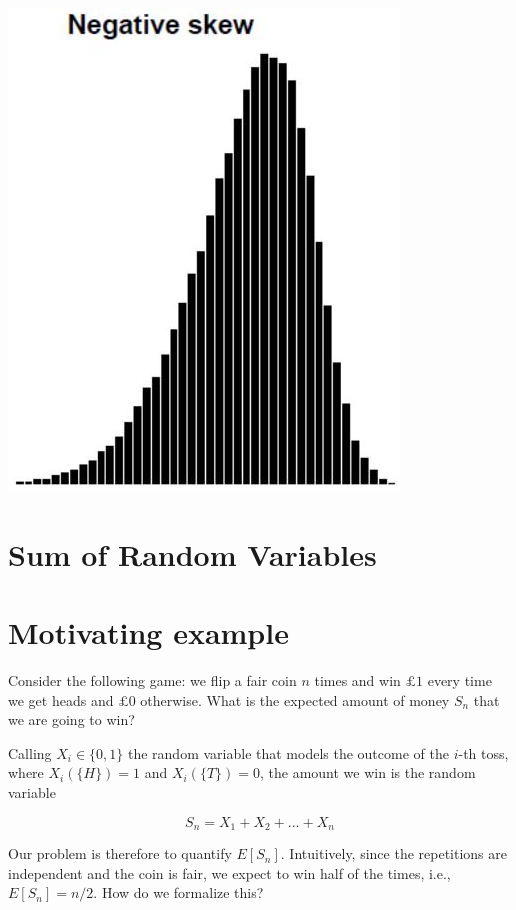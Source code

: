 \documentclass[10pt]{article}
\begin{document}
\includegraphics[max width=\textwidth, center]{2025_05_11_35704811148ad612caa6g-20}

\section*{Sum of Random Variables}
\section*{Motivating example}
Consider the following game: we flip a fair coin $n$ times and win $\pounds 1$ every time we get heads and $\pounds 0$ otherwise. What is the expected amount of money $S_{n}$ that we are going to win?

Calling $X_{i} \in\{0,1\}$ the random variable that models the outcome of the $i$-th toss, where $X_{i}(\{H\})=1$ and $X_{i}(\{T\})=0$, the amount we win is the random variable

$$
S_{n}=X_{1}+X_{2}+\ldots+X_{n}
$$

Our problem is therefore to quantify $E\left[S_{n}\right]$. Intuitively, since the repetitions are independent and the coin is fair, we expect to win half of the times, i.e., $E\left[S_{n}\right]=n / 2$. How do we formalize this?
\end{document}
